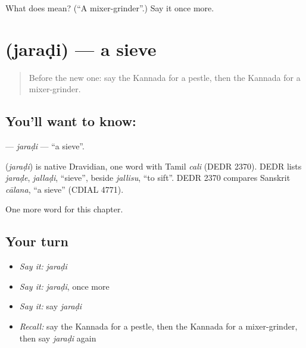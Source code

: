 \begin{tcolorbox}[breakable,colback=teal!4,colframe=teal!35!black,title={Before you move on}]
What does  mean? (\textquotedblleft{}A mixer-grinder\textquotedblright{}.) Say it once more.
\end{tcolorbox}
\section[\texorpdfstring{\kn{ಜರಡಿ} (jaraḍi)}{ಜರಡಿ (jaraḍi)}]{ (jaraḍi) — a sieve}

\label{lesson:KA-C192-jaradi}



\begin{quote}
Before the new one: say the Kannada for a pestle, then the Kannada for a mixer-grinder.
\end{quote}

\subsection*{You'll want to know: }
\textbf{} — \emph{jaraḍi} — \textquotedblleft{}a sieve\textquotedblright{}.

\begin{cousinweb}
\textbf{} (\emph{jaraḍi}) is native Dravidian, one word with Tamil \emph{cali} (DEDR 2370). DEDR lists \emph{jaraḍe}, \emph{jallaḍi}, \textquotedblleft{}sieve\textquotedblright{}, beside \emph{jallisu}, \textquotedblleft{}to sift\textquotedblright{}. DEDR 2370 compares Sanskrit \emph{cālana}, \textquotedblleft{}a sieve\textquotedblright{} (CDIAL 4771).
\end{cousinweb}

\begin{grammarlens}[title={What you've built}]
One more word for this chapter.
\end{grammarlens}

\subsection*{Your turn}
\begin{itemize}
\raggedright
  \item \emph{Say it:} \emph{jaraḍi}
  \item \emph{Say it:} \emph{jaraḍi}, once more
  \item \emph{Say it:} say \emph{jaraḍi}
  \item \emph{Recall:} say the Kannada for a pestle, then the Kannada for a mixer-grinder, then say \emph{jaraḍi} again
\end{itemize}

